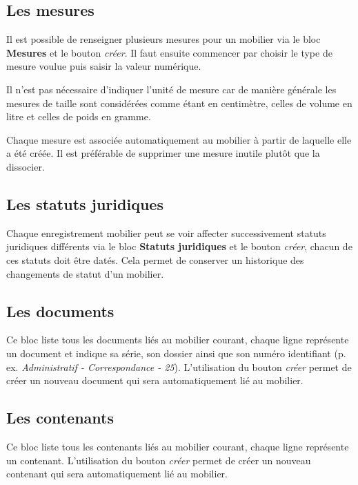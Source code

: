 \documentclass[letterpaper,10pt,french]{sphinxmanual}
\begin{document}
\subsection{Les mesures}
\label{manuel/formulaire_mobilier:les-mesures}
Il est possible de renseigner plusieurs mesures pour un mobilier via le bloc \textbf{Mesures} et le bouton \emph{créer}. Il faut ensuite commencer par choisir le type de mesure voulue puis saisir la valeur numérique.

Il n'est pas nécessaire d'indiquer l'unité de mesure car de manière générale les mesures de taille sont considérées comme étant en centimètre, celles de volume en litre et celles de poids en gramme.

Chaque mesure est associée automatiquement au mobilier à partir de laquelle elle a été créée. Il est préférable de supprimer une mesure inutile plutôt que la dissocier.


\subsection{Les statuts juridiques}
\label{manuel/formulaire_mobilier:les-statuts-juridiques}
Chaque enregistrement mobilier peut se voir affecter successivement statuts juridiques différents via le bloc \textbf{Statuts juridiques} et le bouton \emph{créer}, chacun de ces statuts doit être datés. Cela permet de conserver un historique des changements de statut d'un mobilier.


\subsection{Les documents}
\label{manuel/formulaire_mobilier:les-documents}
Ce bloc liste tous les documents liés au mobilier courant, chaque ligne représente un document et indique sa série, son dossier ainsi que son numéro identifiant (p. ex. \emph{Administratif - Correspondance - 25}). L'utilisation du bouton \emph{créer} permet de créer un nouveau document qui sera automatiquement lié au mobilier.


\subsection{Les contenants}
\label{manuel/formulaire_mobilier:les-contenants}
Ce bloc liste tous les contenants liés au mobilier courant, chaque ligne représente un contenant. L'utilisation du bouton \emph{créer} permet de créer un nouveau contenant qui sera automatiquement lié au mobilier.
\end{document}
